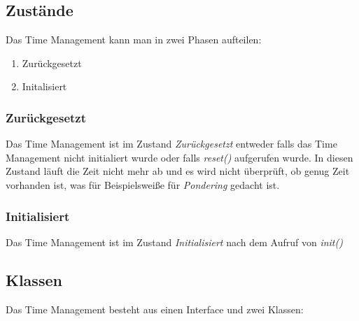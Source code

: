 \subsection{Zust\"ande}
Das Time Management kann man in zwei Phasen aufteilen: 
\begin{enumerate}
    \item{Zur\"uckgesetzt}
    \item{Initalisiert}
\end{enumerate}

\subsubsection{Zur\"uckgesetzt}
Das Time Management ist im Zustand \textit{Zur\"uckgesetzt} entweder falls das Time Management nicht initialiert wurde oder falls \textit{reset()} aufgerufen wurde. In diesen Zustand l\"auft die Zeit nicht mehr ab und es wird nicht \"uberpr\"uft, ob genug Zeit vorhanden ist, was f\"ur Beispielsweiße f\"ur \textit{Pondering} gedacht ist.

\subsubsection{Initialisiert}
Das Time Management ist im Zustand \textit{Initialisiert} nach dem Aufruf von \textit{init()}

\subsection{Klassen}
Das Time Management besteht aus einen Interface und zwei Klassen:
